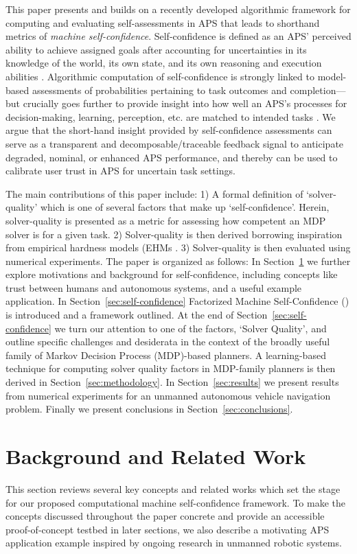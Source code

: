 This paper presents and builds on a recently developed algorithmic framework for computing and evaluating self-assessments in APS that leads to shorthand metrics of \emph{machine self-confidence}. Self-confidence is defined as an APS' perceived ability to achieve assigned goals after accounting for uncertainties in its knowledge of the world, its own state, and its own reasoning and execution abilities \cite{Aitken2016-cv,Aitken2016-fb,Sweet2016-tz}. Algorithmic computation of self-confidence is strongly linked to model-based assessments of probabilities pertaining to task outcomes and completion---but crucially goes further to provide insight into how well an APS's processes for decision-making, learning, perception, etc. are matched to intended tasks \cite{Hutchins2015-if}. 
We argue that the short-hand insight provided by self-confidence assessments can serve as a transparent and decomposable/traceable feedback signal to anticipate degraded, nominal, or enhanced APS performance, %
and thereby can be used to calibrate user trust in APS for uncertain task settings. 

The main contributions of this paper include: 1) A formal definition of `solver-quality' which is one of several factors that make up `self-confidence'. Herein, solver-quality is presented as a metric for assessing how competent an MDP solver is for a given task. 2) Solver-quality is then derived borrowing inspiration from empirical hardness models (EHMs \cite{Leyton-Brown2009-yr}. 3) Solver-quality is then evaluated using numerical experiments. The paper is organized as follows: In Section~\ref{sec:background} we further explore motivations and background for self-confidence, including concepts like trust between humans and autonomous systems, and a useful example application. In Section~\ref{sec:self-confidence} Factorized Machine Self-Confidence (\famsec) is introduced and a framework outlined. At the end of Section~\ref{sec:self-confidence} we turn our attention to one of the \famsec{} factors, `Solver Quality', and outline specific challenges and desiderata in the context of the broadly useful family of Markov Decision Process (MDP)-based planners. A learning-based technique for computing solver quality factors in MDP-family planners is then derived in Section~\ref{sec:methodology}. In Section~\ref{sec:results} we present results from numerical experiments for an unmanned autonomous vehicle navigation problem. Finally we present conclusions in Section~\ref{sec:conclusions}.

\section{Background and Related Work} \label{sec:background}
This section reviews several key concepts and related works which set the stage for our proposed computational machine self-confidence framework. To make the concepts discussed throughout the paper concrete and provide an accessible proof-of-concept testbed in later sections, we also describe a motivating APS application example inspired by ongoing research in unmanned robotic systems.  

